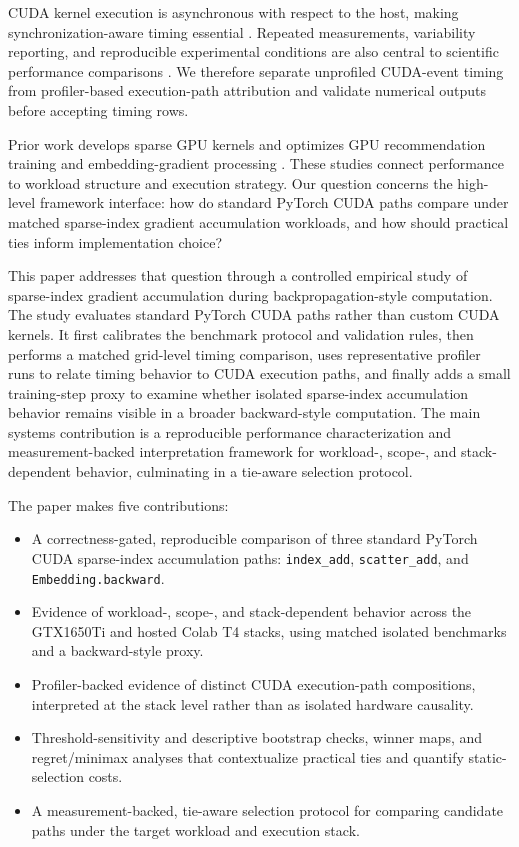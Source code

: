 CUDA kernel execution is asynchronous with respect to the host, making synchronization-aware timing essential \citep{nvidia2026cudaguide}. Repeated measurements, variability reporting, and reproducible experimental conditions are also central to scientific performance comparisons \citep{hoefler2015benchmarking}. We therefore separate unprofiled CUDA-event timing from profiler-based execution-path attribution and validate numerical outputs before accepting timing rows.

Prior work develops sparse GPU kernels \citep{gale2020sparse} and optimizes GPU recommendation training and embedding-gradient processing \citep{mudigere2022neo,liu2024embark}. These studies connect performance to workload structure and execution strategy. Our question concerns the high-level framework interface: how do standard PyTorch CUDA paths compare under matched sparse-index gradient accumulation workloads, and how should practical ties inform implementation choice?

This paper addresses that question through a controlled empirical study of sparse-index gradient accumulation during backpropagation-style computation. The study evaluates standard PyTorch CUDA paths rather than custom CUDA kernels. It first calibrates the benchmark protocol and validation rules, then performs a matched grid-level timing comparison, uses representative profiler runs to relate timing behavior to CUDA execution paths, and finally adds a small training-step proxy to examine whether isolated sparse-index accumulation behavior remains visible in a broader backward-style computation. The main systems contribution is a reproducible performance characterization and measurement-backed interpretation framework for workload-, scope-, and stack-dependent behavior, culminating in a tie-aware selection protocol.

The paper makes five contributions:
\begin{itemize}
\item A correctness-gated, reproducible comparison of three standard PyTorch CUDA sparse-index accumulation paths: \texttt{index\_add}, \texttt{scatter\_add}, and \texttt{Embedding.backward}.
\item Evidence of workload-, scope-, and stack-dependent behavior across the GTX1650Ti and hosted Colab T4 stacks, using matched isolated benchmarks and a backward-style proxy.
\item Profiler-backed evidence of distinct CUDA execution-path compositions, interpreted at the stack level rather than as isolated hardware causality.
\item Threshold-sensitivity and descriptive bootstrap checks, winner maps, and regret/minimax analyses that contextualize practical ties and quantify static-selection costs.
\item A measurement-backed, tie-aware selection protocol for comparing candidate paths under the target workload and execution stack.
\end{itemize}

